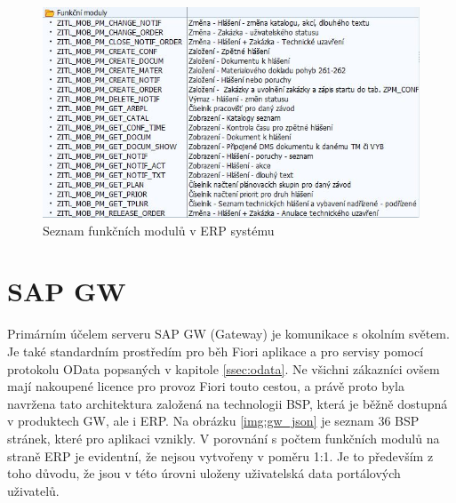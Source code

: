 \documentclass[thesis=M,czech]{FITthesis}[2012/06/26]
\begin{document}
\begin{figure}[H]
	\centering
	\includegraphics[width=1\textwidth]{images/erp_fm}
	\caption{Seznam funkčních modulů v ERP systému}
	\label{img:erp_fm}
\end{figure}

\section{SAP GW}
Primárním účelem serveru SAP GW (Gateway) je komunikace s okolním světem. Je také standardním prostředím pro běh Fiori aplikace a pro servisy pomocí protokolu OData popsaných v kapitole \ref{ssec:odata}. Ne všichni zákazníci ovšem mají nakoupené licence pro provoz Fiori touto cestou, a právě proto byla navržena tato architektura založená na technologii BSP, která je běžně dostupná v produktech GW, ale i ERP. Na obrázku \ref{img:gw_json} je seznam 36 BSP stránek, které pro aplikaci vznikly. V porovnání s počtem funkčních modulů na straně ERP je evidentní, že nejsou vytvořeny v poměru 1:1. Je to především z toho důvodu, že jsou v této úrovni uloženy uživatelská data portálových uživatelů. 
\end{document}
